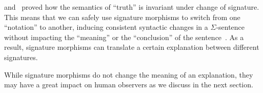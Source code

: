 

\begin{remark}
\citet{tarski1944semantic} and~\citet{goguen1992institutions} proved how the semantics of ``truth'' is invariant under change of signature. This means that we can safely use signature morphisms to %
switch from one ``notation'' to another, inducing consistent syntactic changes in a $\Sigma$-sentence without impacting the ``meaning'' or the ``conclusion'' of the sentence~\cite{goguen1992institutions}. As a result, signature morphisms can translate a certain explanation between different signatures.
\end{remark}
While signature morphisms do not change the meaning of an explanation, they may have a great impact on human observers as we discuss in the next section.


